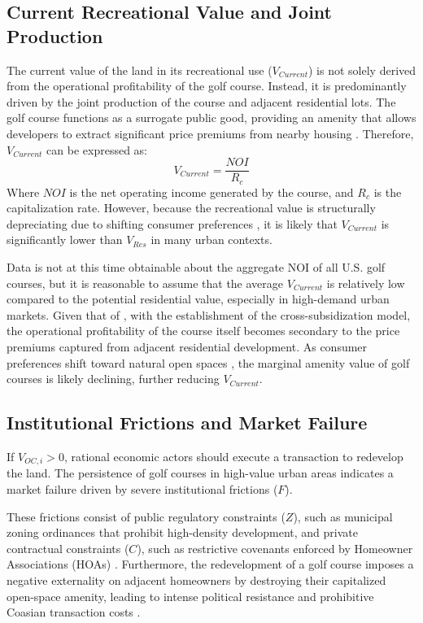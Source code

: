 \documentclass[10pt, letterpaper]{article}
\begin{document}
\subsection{Current Recreational Value and Joint Production}
The current value of the land in its recreational use ($V_{Current}$) is not solely derived from the operational profitability of the golf course. Instead, it is predominantly driven by the joint production of the course and adjacent residential lots. The golf course functions as a surrogate public good, providing an amenity that allows developers to extract significant price premiums from nearby housing \parencite{Limehouse2012}. Therefore, $V_{Current}$ can be expressed as:
\begin{equation}
    V_{Current} = \frac{NOI}{R_c}
\end{equation}
Where $NOI$ is the net operating income generated by the course, and $R_c$ is the capitalization rate. However, because the recreational value is structurally depreciating due to shifting consumer preferences \parencite{Cho2009}, it is likely that $V_{Current}$ is significantly lower than $V_{Res}$ in many urban contexts.

Data is not at this time obtainable about the aggregate NOI of all U.S. golf courses, but it is reasonable to assume that the average $V_{Current}$ is relatively low compared to the potential residential value, especially in high-demand urban markets. Given that of \textcite{Limehouse2012}, with the establishment of the cross-subsidization model, the operational profitability of the course itself becomes secondary to the price premiums captured from adjacent residential development. As consumer preferences shift toward natural open spaces \parencite{Cho2009}, the marginal amenity value of golf courses is likely declining, further reducing $V_{Current}$.

\subsection{Institutional Frictions and Market Failure}
If $V_{OC, i} > 0$, rational economic actors should execute a transaction to redevelop the land. The persistence of golf courses in high-value urban areas indicates a market failure driven by severe institutional frictions ($F$). 

These frictions consist of public regulatory constraints ($Z$), such as municipal zoning ordinances that prohibit high-density development, and private contractual constraints ($C$), such as restrictive covenants enforced by Homeowner Associations (HOAs) \parencite{Ellickson2022, Korngold2024}. Furthermore, the redevelopment of a golf course imposes a negative externality on adjacent homeowners by destroying their capitalized open-space amenity, leading to intense political resistance and prohibitive Coasian transaction costs \parencite{Coase1960}.
\end{document}
